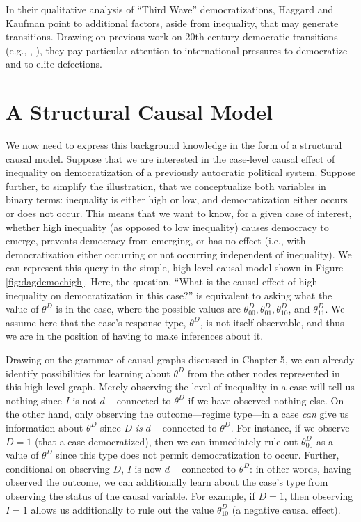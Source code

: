 \documentclass[
  12pt,
]{book}
\begin{document}
In their qualitative analysis of ``Third Wave'' democratizations, Haggard and Kaufman point to additional factors, aside from inequality, that may generate transitions. Drawing on previous work on 20th century democratic transitions (e.g., \citet{huntington1993third}, \citet{linz1996problems}), they pay particular attention to international pressures to democratize and to elite defections.

\hypertarget{a-structural-causal-model}{%
\section{A Structural Causal Model}\label{a-structural-causal-model}}

We now need to express this background knowledge in the form of a structural causal model. Suppose that we are interested in the case-level causal effect of inequality on democratization of a previously autocratic political system. Suppose further, to simplify the illustration, that we conceptualize both variables in binary terms: inequality is either high or low, and democratization either occurs or does not occur. This means that we want to know, for a given case of interest, whether high inequality (as opposed to low inequality) causes democracy to emerge, prevents democracy from emerging, or has no effect (i.e., with democratization either occurring or not occurring independent of inequality). We can represent this query in the simple, high-level causal model shown in Figure \ref{fig:dagdemochigh}. Here, the question, ``What is the causal effect of high inequality on democratization in this case?'' is equivalent to asking what the value of \(\theta^D\) is in the case, where the possible values are \(\theta_{00}^D, \theta_{01}^D, \theta_{10}^D\), and \(\theta_{11}^D\). We assume here that the case's response type, \(\theta^D\), is not itself observable, and thus we are in the position of having to make inferences about it.

Drawing on the grammar of causal graphs discussed in Chapter 5, we can already identify possibilities for learning about \(\theta^D\) from the other nodes represented in this high-level graph. Merely observing the level of inequality in a case will tell us nothing since \(I\) is not \(d-\)connected to \(\theta^D\) if we have observed nothing else. On the other hand, only observing the outcome---regime type---in a case \emph{can} give us information about \(\theta^D\) since \(D\) \emph{is} \(d-\)connected to \(\theta^D\). For instance, if we observe \(D=1\) (that a case democratized), then we can immediately rule out \(\theta_{00}^D\) as a value of \(\theta^D\) since this type does not permit democratization to occur. Further, conditional on observing \(D\), \(I\) is now \(d-\)connected to \(\theta^D\): in other words, having observed the outcome, we can additionally learn about the case's type from observing the status of the causal variable. For example, if \(D=1\), then observing \(I=1\) allows us additionally to rule out the value \(\theta_{10}^D\) (a negative causal effect).
\end{document}
